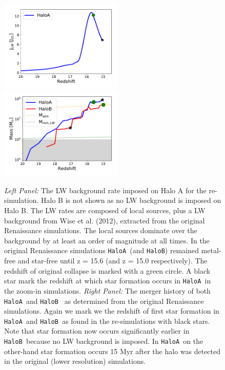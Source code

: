 \documentclass[graphics, twocolumn, usenatbib]{mn2e}
\newcommand{\ha} {\texttt{HaloA~}}
\newcommand{\hb} {\texttt{HaloB~}}
\begin{document}
\begin{figure}
\centering
\begin{minipage}{175mm}      \begin{center} 
\centerline{
\includegraphics[width=0.52\textwidth]{FIGURES/Combined.pdf}
\includegraphics[width=0.52\textwidth]{FIGURES/MassRedshift.pdf}}
\caption{\textit{Left Panel:} The LW background rate imposed on Halo A for the re-simulation. Halo B is not shown
  as no LW background is imposed on Halo B. The LW rates
  are composed of local sources, plus a LW background from Wise et al. (2012), extracted from the original
  Renaissance simulations. The local sources dominate over the background by at least an order of magnitude at
  all times. In the original
  Renaissance simulations \ha (and \texttt{HaloB})  remained metal-free and star-free until z = 15.6 (and
  z = 15.0 respectively). The redshift of original collapse is marked with a green circle.
  A black star mark the redshift at which star formation occurs in \ha in the zoom-in simulations.
  \textit{Right Panel:} The merger history of both \ha and \hb
  as determined from the original Renaissance simulations. Again we mark we the redshift of first star formation
  in \ha and \hb as found in the re-simulations with black stars. Note that star formation now occurs significantly
  earlier in \hb because no LW background is imposed. In \ha on the other-hand star formation occurs 15 Myr after
  the halo was detected in the original (lower resolution) simulations. 
  }  \label{Fig:LWHistory}
\end{center} \end{minipage}

\end{figure}
\end{document}
